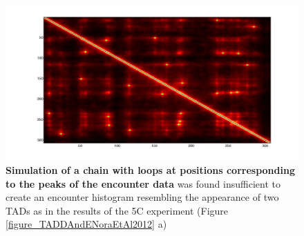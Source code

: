 \documentclass[12pt]{article}
\begin{document}
\begin{figure}[H]
\includegraphics[scale=0.2]{meanEncounterMatrixOfSimulatingTADEandDWithLoops}
\caption{\textbf{Simulation of a chain with loops at positions corresponding to the peaks of the encounter data} was found insufficient to create an encounter histogram resembling the appearance of two TADs as in the results of the 5C experiment (Figure \ref{figure_TADDAndENoraEtAl2012} a)}
\label{figure_encounterProbabilityPeaksOfTheEncounterData}
\end{figure}
\end{document}
